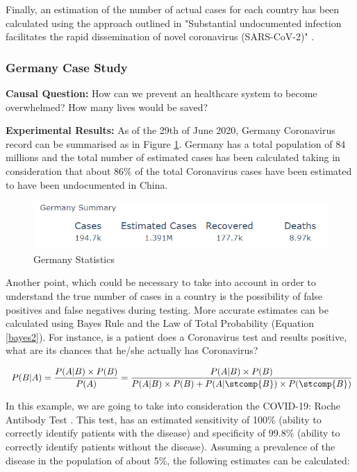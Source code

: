 Finally, an estimation of the number of actual cases for each country has been calculated using the approach outlined in "Substantial undocumented infection facilitates the rapid dissemination of novel coronavirus (SARS-CoV-2)" \cite{cases_paper}.

\subsubsection{Germany Case Study}

\textbf{Causal Question:} How can we prevent an healthcare system to become overwhelmed? How many lives would be saved?

\textbf{Experimental Results:} As of the 29th of June 2020, Germany Coronavirus record can be summarised as in Figure \ref{germ}. Germany has a total population of 84 millions and the total number of estimated cases has been calculated taking in consideration that about 86\% of the total Coronavirus cases have been estimated to have been undocumented \cite{cases_paper} in China.

\begin{figure}[ht!]%
    \centering
    \includegraphics[width=12cm]{latex/images/cov_g.PNG}%
    \caption{Germany Statistics}
    \label{germ}
\end{figure}

Another point, which could be necessary to take into account in order to understand the true number of cases in a country is the possibility of false positives and false negatives during testing. More accurate estimates can be calculated using Bayes Rule and the Law of Total Probability (Equation \ref{bayes2}). For instance, is a patient does a Coronavirus test and results positive, what are its chances that he/she actually has Coronavirus?

\useshortskip
\begin{align}
\ P(B|A) = \frac{P(A|B)\times P(B)}{P(A)} = \frac{P(A|B)\times P(B)}{P(A|B)\times P(B) + P(A|\stcomp{B})\times P(\stcomp{B})}
\label{bayes2}
\end{align}
\useshortskip

In this example, we are going to take into consideration the COVID-19: Roche Antibody Test \cite{roche}. This test, has an estimated sensitivity of 100\% (ability to correctly identify patients with the disease) and specificity of 99.8\% (ability to correctly identify patients without the disease). Assuming a prevalence of the disease in the population of about 5\%, the following estimates can be calculated:

